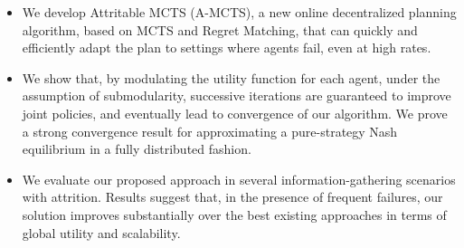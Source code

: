 \begin{itemize}[leftmargin=*]
\item We develop Attritable MCTS (A-MCTS), a new online decentralized planning algorithm, based on MCTS and Regret Matching, that can quickly and efficiently adapt the plan to settings where agents fail, even at high rates.
\item We show that, by modulating the utility function for each agent, under the assumption of submodularity, successive iterations are guaranteed to improve joint policies, and eventually lead to convergence of our algorithm.
We prove a strong convergence result for approximating a pure-strategy Nash equilibrium in a fully distributed fashion.
\item We evaluate our proposed approach in several information-gathering scenarios with attrition. Results suggest that, in the presence of frequent failures, our solution improves substantially over the best existing approaches in terms of global utility and scalability.
\end{itemize}